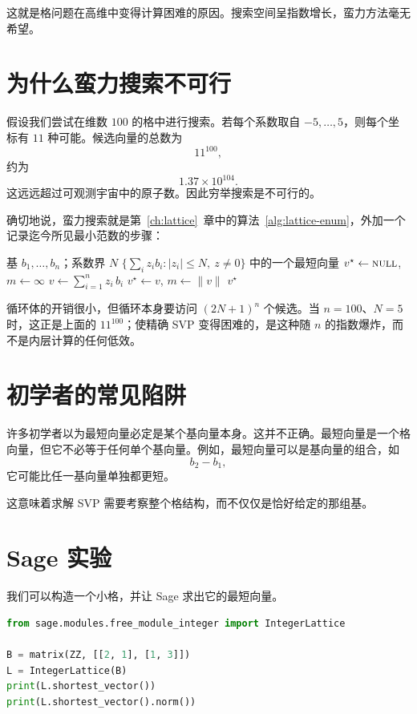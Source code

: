 这就是格问题在高维中变得计算困难的原因。搜索空间呈指数增长，蛮力方法毫无希望。

\section{为什么蛮力搜索不可行}

假设我们尝试在维数 $100$ 的格中进行搜索。若每个系数取自 $-5,\dots,5$，则每个坐标有 $11$ 种可能。候选向量的总数为
\[
11^{100},
\]
约为
\[
1.37\times 10^{104}.
\]
这远远超过可观测宇宙中的原子数。因此穷举搜索是不可行的。

确切地说，蛮力搜索就是第~\ref{ch:lattice}~章中的算法~\ref{alg:lattice-enum}，外加一个记录迄今所见最小范数的步骤：

\begin{algorithm}[H]
\caption{蛮力最短向量搜索}
\label{alg:svp-bruteforce}
\begin{algorithmic}[1]
\Require 基 $b_1,\dots,b_n$；系数界 $N$
\Ensure $\{\sum_i z_i b_i : |z_i|\le N,\ z\ne 0\}$ 中的一个最短向量
\State $v^\star \gets \textsc{null}$, \quad $m \gets \infty$
    \State $v \gets \sum_{i=1}^{n} z_i\, b_i$
        \State $v^\star \gets v$, \quad $m \gets \|v\|$
    \EndIf
\EndFor
\State \Return $v^\star$
\end{algorithmic}
\end{algorithm}

循环体的开销很小，但循环本身要访问 $(2N+1)^n$ 个候选。当 $n=100$、$N=5$ 时，这正是上面的 $11^{100}$；使精确 SVP 变得困难的，是这种随 $n$ 的指数爆炸，而不是内层计算的任何低效。

\section{初学者的常见陷阱}

许多初学者以为最短向量必定是某个基向量本身。这并不正确。最短向量是一个格向量，但它不必等于任何单个基向量。例如，最短向量可以是基向量的组合，如
\[
 b_2-b_1,
\]
它可能比任一基向量单独都更短。

这意味着求解 SVP 需要考察整个格结构，而不仅仅是恰好给定的那组基。

\section{Sage 实验}

我们可以构造一个小格，并让 Sage 求出它的最短向量。

\begin{lstlisting}[language=Python]
from sage.modules.free_module_integer import IntegerLattice

B = matrix(ZZ, [[2, 1], [1, 3]])
L = IntegerLattice(B)
print(L.shortest_vector())
print(L.shortest_vector().norm())
\end{lstlisting}

